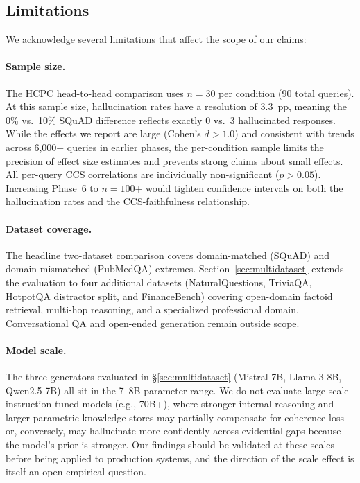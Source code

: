 \subsection{Limitations}
\label{sec:limitations}

We acknowledge several limitations that affect the scope of our claims:

\paragraph{Sample size.} The HCPC head-to-head comparison uses $n = 30$ per
condition (90 total queries). At this sample size, hallucination rates have
a resolution of 3.3~pp, meaning the 0\% vs.\ 10\% SQuAD difference
reflects exactly 0 vs.\ 3 hallucinated responses. While the effects we
report are large (Cohen's $d > 1.0$) and consistent with trends across
6,000+ queries in earlier phases, the per-condition sample limits the
precision of effect size estimates and prevents strong claims about small
effects. All per-query CCS correlations are individually non-significant
($p > 0.05$). Increasing Phase~6 to $n = 100$+ would tighten confidence
intervals on both the hallucination rates and the CCS-faithfulness
relationship.

\paragraph{Dataset coverage.} The headline two-dataset comparison covers
domain-matched (SQuAD) and domain-mismatched (PubMedQA) extremes.
Section~\ref{sec:multidataset} extends the evaluation to four additional
datasets (NaturalQuestions, TriviaQA, HotpotQA distractor split, and
FinanceBench) covering open-domain factoid retrieval, multi-hop
reasoning, and a specialized professional domain. Conversational QA and
open-ended generation remain outside scope.

\paragraph{Model scale.} The three generators evaluated in
§\ref{sec:multidataset} (Mistral-7B, Llama-3-8B, Qwen2.5-7B) all sit in
the 7--8B parameter range. We do not evaluate large-scale
instruction-tuned models (e.g., 70B+), where stronger internal reasoning
and larger parametric knowledge stores may partially compensate for
coherence loss---or, conversely, may hallucinate more confidently across
evidential gaps because the model's prior is stronger. Our findings
should be validated at these scales before being applied to production
systems, and the direction of the scale effect is itself an open
empirical question.

